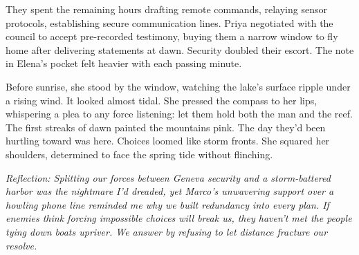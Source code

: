They spent the remaining hours drafting remote commands, relaying sensor protocols, establishing secure communication lines. Priya negotiated with the council to accept pre-recorded testimony, buying them a narrow window to fly home after delivering statements at dawn. Security doubled their escort. The note in Elena's pocket felt heavier with each passing minute.

Before sunrise, she stood by the window, watching the lake's surface ripple under a rising wind. It looked almost tidal. She pressed the compass to her lips, whispering a plea to any force listening: let them hold both the man and the reef. The first streaks of dawn painted the mountains pink. The day they'd been hurtling toward was here. Choices loomed like storm fronts. She squared her shoulders, determined to face the spring tide without flinching.


\noindent\textit{Reflection: Splitting our forces between Geneva security and a storm-battered harbor was the nightmare I'd dreaded, yet Marco's unwavering support over a howling phone line reminded me why we built redundancy into every plan. If enemies think forcing impossible choices will break us, they haven't met the people tying down boats upriver. We answer by refusing to let distance fracture our resolve.}
